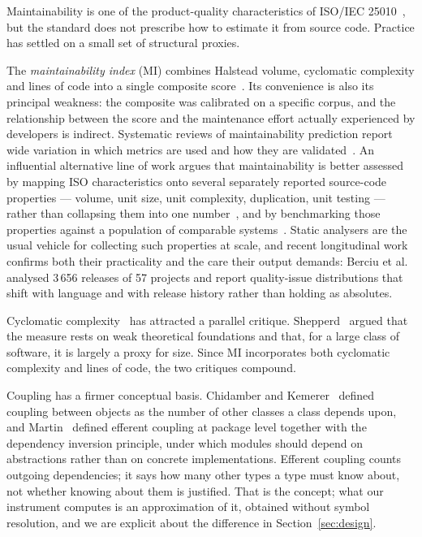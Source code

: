 \documentclass{sbc2019}%
\begin{document}
Maintainability is one of the product-quality characteristics of ISO/IEC 25010~\cite{iso25010}, but the standard does not prescribe how to estimate it from
source code. Practice has settled on a small set of structural proxies.

The \emph{maintainability index} (MI) combines Halstead volume, cyclomatic
complexity and lines of code into a single composite score~\cite{coleman1994}. Its convenience is also its principal weakness: the
composite was calibrated on a specific corpus, and the relationship between the
score and the maintenance effort actually experienced by developers is
indirect. Systematic reviews of maintainability prediction report wide
variation in which metrics are used and how they are validated~\cite{riaz2009,ardito2020}. An influential alternative line of work argues that
maintainability is better assessed by mapping ISO characteristics onto several
separately reported source-code properties --- volume, unit size, unit
complexity, duplication, unit testing --- rather than collapsing them into one
number~\cite{heitlager2007}, and by benchmarking those properties against a
population of comparable systems~\cite{baggen2012}. Static analysers are the
usual vehicle for collecting such properties at scale, and recent longitudinal
work confirms both their practicality and the care their output demands: Berciu
et al.\ \cite{berciu2026} analysed 3\,656 releases of 57 projects and report
quality-issue distributions that shift with language and with release history
rather than holding as absolutes.

Cyclomatic complexity~\cite{mccabe1976} has attracted a parallel critique.
Shepperd~\cite{shepperd1988} argued that the measure rests on weak theoretical
foundations and that, for a large class of software, it is largely a proxy for
size. Since MI incorporates both cyclomatic complexity and lines of code, the
two critiques compound.

Coupling has a firmer conceptual basis. Chidamber and Kemerer~\cite{chidamber1994} defined coupling between objects as the number of other
classes a class depends upon, and Martin~\cite{martin2003} defined efferent
coupling at package level together with the dependency inversion principle,
under which modules should depend on abstractions rather than on concrete
implementations. Efferent coupling counts outgoing dependencies; it says how
many other types a type must know about, not whether knowing about them is
justified. That is the concept; what our instrument computes is an
approximation of it, obtained without symbol resolution, and we are explicit
about the difference in Section~\ref{sec:design}.
\end{document}
